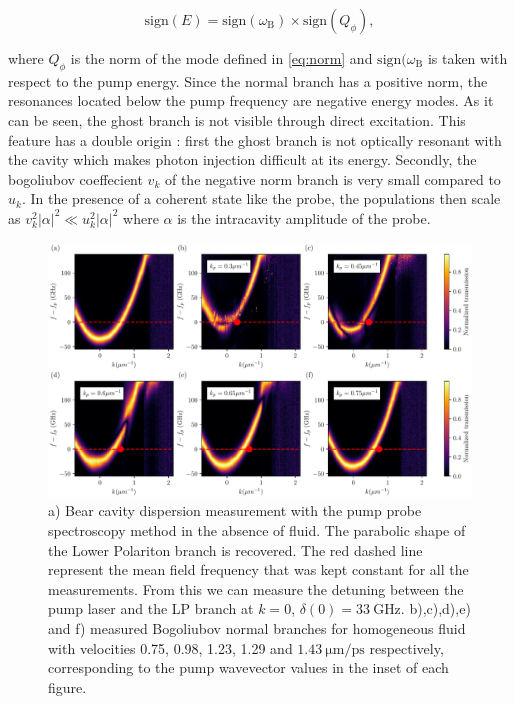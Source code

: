  \begin{equation}
    \mathrm{sign}(E)=\mathrm{sign}(\omega_\mathrm{B})\times \mathrm{sign}(Q_{\phi}),
 \end{equation}
 
where $Q_{\phi}$ is the norm of the mode defined in \autoref{eq:norm} and $\mathrm{sign}(\omega_\mathrm{B}$ is taken with respect to the pump energy. Since the normal branch has a positive norm, the resonances located
below the pump frequency are negative energy modes. As it can be seen, the ghost branch is not visible through direct excitation. This feature has a double origin : first the ghost branch is not optically resonant with the cavity which makes photon injection difficult at its energy. Secondly,
the bogoliubov coeffecient $v_k$ of the negative norm branch is very small compared to $u_k$.  In the presence of
a coherent state like the probe, the populations then scale as $v_k^2 |\alpha|^2\ll u_k^2|\alpha|^2$ where $\alpha$ is the intracavity amplitude of the probe. 

\begin{figure}[h!]
    \centering
    \includegraphics[width=1\textwidth]{chap_custom_st/fig/homogeneous_doppler.pdf}
    \caption{a) Bear cavity dispersion measurement with the pump probe spectroscopy method in the absence of fluid. 
    The parabolic shape of the Lower Polariton branch is recovered.  
    The red dashed line represent the mean field frequency that was kept constant for all the measurements. 
    From this we can measure the detuning between the pump laser and the LP branch at $k=0$,
     $\delta(0) = \SI{33}{\giga\hertz}$. b),c),d),e) and f) measured Bogoliubov normal branches for homogeneous fluid with velocities 0.75, 0.98, 1.23, 1.29 and $\SI{1.43}{\micro \meter \per \pico \second}$ respectively, corresponding 
    to the pump wavevector values in the inset of each figure.}
     
    \label{fig:homogeneous_fluid_bogo}
\end{figure}

